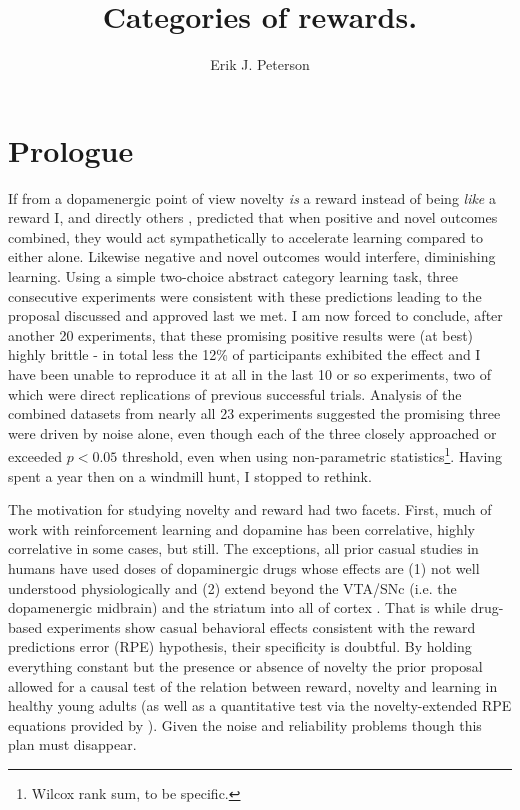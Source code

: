 \documentclass[doc,12pt]{apa}        %
\title{Categories of rewards.}
\author{Erik J. Peterson} \affiliation{Dept. of Psychology \\ Colorado State University \\ Fort Collins, CO}
\begin{document}
 
\maketitle

\section{Prologue} %
\label{sec:prologue}
If from a dopamenergic point of view novelty \emph{is} a reward instead of being \emph{like} a reward I, and directly others \cite{Kakade:2002p6414}, predicted that when positive and novel outcomes combined, they would act sympathetically to accelerate learning compared to either alone.  Likewise negative and novel outcomes would interfere, diminishing learning.  Using a simple two-choice abstract category learning task, three consecutive experiments were consistent with these predictions leading to the proposal discussed and approved last we met.  I am now forced to conclude, after another 20 experiments, that these promising positive results were (at best) highly brittle - in total less the 12\% of participants exhibited the effect and I have been unable to reproduce it at all in the last 10 or so experiments, two of which were direct replications of previous successful trials.  Analysis of the combined datasets from nearly all 23 experiments suggested the promising three were driven by noise alone, even though each of the three closely approached or exceeded $p < 0.05$ threshold, even when using non-parametric statistics\footnote{Wilcox rank sum, to be specific.}.  Having spent a year then on a windmill hunt, I stopped to rethink. 

The motivation for studying novelty and reward had two facets.  First, much of work with reinforcement learning and dopamine has been correlative, highly correlative in some cases, but still.  The exceptions, all prior casual studies in humans have used doses of dopaminergic drugs whose effects are (1) not well understood physiologically and (2) extend beyond the VTA/SNc (i.e. the dopamenergic midbrain) and the striatum into all of cortex \cite{Menon:2007p6529,Pizzagalli:2008p6521,Schonberg:2009p6669}.  That is while drug-based experiments show casual behavioral effects consistent with the reward predictions error (RPE) hypothesis, their specificity is doubtful.  By holding everything constant but the presence or absence of novelty the prior proposal allowed for a causal test of the relation between reward, novelty and learning in healthy young adults (as well as a quantitative test via the novelty-extended RPE equations provided by ).  Given the noise and reliability problems though this plan must disappear.  
\end{document}
